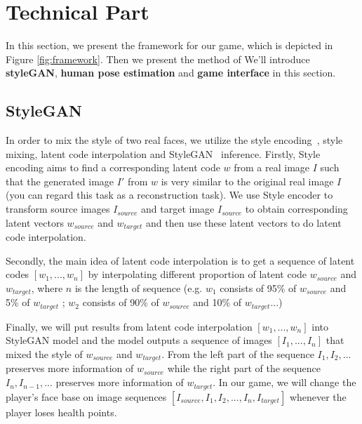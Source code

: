 \section{Technical Part}


In this section, we present the framework for our game, which is depicted in Figure \ref{fig:framework}. Then we present the method of 
We'll introduce \textbf{styleGAN}, \textbf{human pose estimation} and \textbf{game interface} in this section.

\subsection{StyleGAN}
In order to mix the style of two real faces, we utilize the style encoding~\cite{richardson2021encoding}, style mixing, latent code interpolation and StyleGAN~\cite{karras2019style} \cite{karras2020analyzing} inference. Firstly, Style encoding aims to find a corresponding latent code $w$ from a real image $I$ such that the generated image $I'$ from $w$ is very similar to the original real image $I$ (you can regard this task as a reconstruction task). We use Style encoder to transform source images $I_{source}$ and target image $I_{source}$ to obtain corresponding latent vectors $w_{source}$ and $w_{target}$ and then use these latent vectors to do latent code interpolation.


Secondly, the main idea of latent code interpolation is to get a sequence of latent codes $[w_1,...,w_n]$ by interpolating different proportion of latent code $w_{source}$ and $w_{target}$, where $n$ is the length of sequence (e.g. $w_1$ consists of 95\% of $w_{source}$ and 5\% of $w_{target}$ ; $w_2$ consists of 90\% of $w_{source}$ and 10\% of $w_{target}$...)

Finally, we will put results from latent code interpolation $[w_1,...,w_n]$ into StyleGAN model and the model outputs a sequence of images $[I_1,...,I_n]$ that mixed the style of $w_{source}$ and $w_{target}$. From the left part of the sequence $I_1,I_2,...$ preserves more information of $w_{source}$ while the right part of the sequence $I_n,I_{n-1},...$ preserves more information of $w_{target}$. In our game, we will change the player's face base on image sequences $[I_{source},I_1,I_2, ... ,I_n,I_{target}]$ whenever the player loses health points. 

